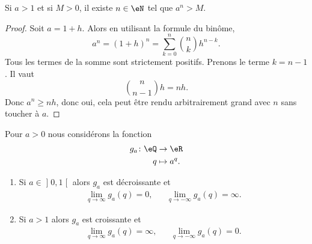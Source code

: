 \begin{proposition}\label{PROPooVXKBooQPPjMn}
    Si \( a>1\) et si \( M>0\), il existe \( n\in \eN\) tel que \( a^n>M\).
\end{proposition}

\begin{proof}
    Soit \( a=1+h\). Alors en utilisant la formule du binôme, 
    \begin{equation}
        a^n=(1+h)^n=\sum_{k=0}^n{n\choose k}h^{n-k}.
    \end{equation}
    Tous les termes de la somme sont strictement positifs. Prenons le terme \( k=n-1\). Il vaut
    \begin{equation}
        {n\choose n-1}h=nh.
    \end{equation}
    Donc \( a^n\geq nh\), donc oui, cela peut être rendu arbitrairement grand avec \( n\) sans toucher à \( a\).
\end{proof}

\begin{proposition}      \label{PROPooGCBZooTcyGtO}
    Pour \( a>0\) nous considérons la fonction
    \begin{equation}
        \begin{aligned}
            g_a\colon \eQ&\to \eR \\
            q&\mapsto a^q.
        \end{aligned}
    \end{equation}
    \begin{enumerate}
        \item
            Si \( a\in \mathopen] 0 , 1 \mathclose[\) alors \( g_a\) est décroissante et
            \begin{subequations}
                \begin{align}
                    \lim_{q\to \infty} g_a(q)=0,&& \lim_{q\to -\infty} g_a(q)=\infty.
                \end{align}
           \end{subequations}
         \item
            Si \( a>1\)  alors \( g_a\) est croissante et
            \begin{subequations}
                \begin{align}
                    \lim_{q\to \infty} g_a(q)=\infty,&& \lim_{q\to -\infty} g_a(q)=0.
                \end{align}
           \end{subequations}
    \end{enumerate}
\end{proposition}

